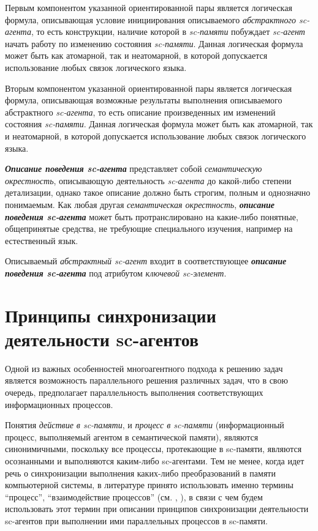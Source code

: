 Первым компонентом указанной ориентированной пары является логическая формула, описывающая условие инициирования описываемого \textit{абстрактного sc-агента}, то есть конструкции, наличие которой в \textit{sc-памяти} побуждает \textit{sc-агент} начать работу по изменению состояния \textit{sc-памяти}. Данная логическая формула может быть как атомарной, так и неатомарной, в которой допускается использование любых связок логического языка.

Вторым компонентом указанной ориентированной пары является логическая формула, описывающая возможные результаты выполнения описываемого абстрактного \textit{sc-агента}, то есть описание произведенных им изменений состояния \textit{sc-памяти}. Данная логическая формула может быть как атомарной, так и неатомарной, в которой допускается использование любых связок логического языка.

\begin{SCn}
\end{SCn}

\textbf{\textit{Описание поведения sc-агента}} представляет собой \textit{семантическую окрестность}, описывающую деятельность \textit{sc-агента} до какой-либо степени детализации, однако такое описание должно быть строгим, полным и однозначно понимаемым. Как любая другая \textit{семантическая окрестность}, \textbf{\textit{описание поведения sc-агента}} может быть протранслировано на какие-либо понятные, общепринятые средства, не требующие специального изучения, например на естественный язык.

Описываемый \textit{абстрактный sc-агент} входит в соответствующее \textbf{\textit{описание поведения sc-агента}} под атрибутом \textit{ключевой sc-элемент\scnrolesign}.

\section{Принципы синхронизации деятельности sc-агентов}
\label{sec_ps_sync}

Одной из важных особенностей многоагентного подхода к решению задач является возможность параллельного решения различных задач, что в свою очередь, предполагает параллельность выполнения соответствующих информационных процессов.

Понятия \textit{действие в sc-памяти}, и \textit{процесс в sc-памяти} (информационный процесс, выполняемый агентом в семантической памяти), являются синонимичными, поскольку все процессы, протекающие в sc-памяти, являются осознанными и выполняются каким-либо sc-агентами. Тем не менее, когда идет речь о синхронизации выполнения каких-либо преобразований в памяти компьютерной системы, в литературе принято использовать именно термины ``процесс'', ``взаимодействие процессов'' (см. , ), в связи с чем будем использовать этот термин при описании принципов синхронизации деятельности sc-агентов при выполнении ими параллельных процессов в sc-памяти.

